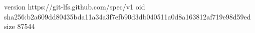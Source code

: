 version https://git-lfs.github.com/spec/v1
oid sha256:b2a609dd80435bda11a34a3f7efb90d3db040511a0d8a163812af719e98d59ed
size 87544
